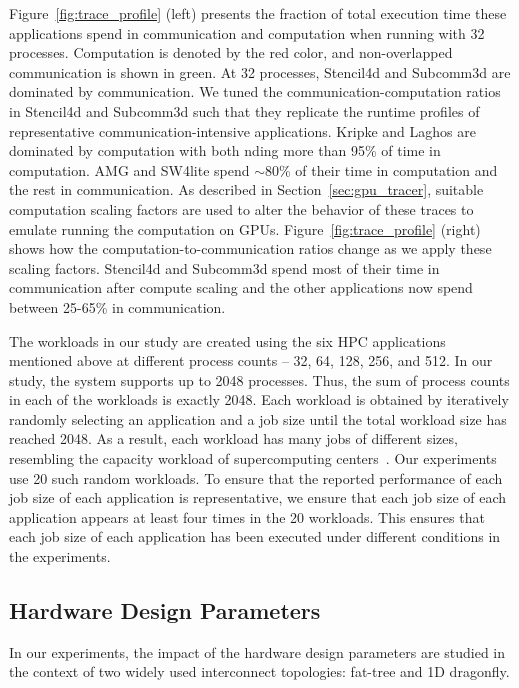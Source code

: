 Figure~\ref{fig:trace_profile} (left) presents the fraction of total execution
time these applications spend in communication and computation when running
with 32 processes.  Computation is denoted by the red color, and non-overlapped
communication is shown in green. At 32 processes, Stencil4d and Subcomm3d are
dominated by communication. We tuned the communication-computation ratios in
Stencil4d and Subcomm3d such that they replicate the runtime profiles of
representative communication-intensive applications.  Kripke and Laghos are
dominated by computation with both nding more than 95\% of time in computation.
AMG and SW4lite spend $\sim$80\% of their time in computation and the rest in
communication.  As described in Section~\ref{sec:gpu_tracer}, suitable
computation scaling factors are used to alter the behavior of these traces to
emulate running the computation on GPUs. Figure~\ref{fig:trace_profile} (right)
shows how the computation-to-communication ratios change as we apply these
scaling factors. Stencil4d and Subcomm3d spend most of their time in
communication after compute scaling and the other applications now spend
between 25-65\% in communication.

The workloads in our study are created using the six HPC applications mentioned
above at different process counts -- 32, 64, 128, 256, and 512.  In our study,
the system supports up to 2048 processes. Thus, the sum of process counts in
each of the workloads is exactly 2048.  Each workload is obtained by
iteratively randomly selecting an application and a job size until the total
workload size has reached 2048.  As a result, each workload has many jobs of
different sizes, resembling the capacity workload of supercomputing
centers~\cite{jain2016evaluating}.  Our experiments use 20 such random
workloads. To ensure that the reported performance of each job size of each
application is representative, we ensure that each job size of each application
appears at least four times in the 20 workloads. This ensures that each job
size of each application has been executed under different conditions in the
experiments.
 
\subsection{Hardware Design Parameters}
\label{sec:hardwareparameters}

\vspace{0.08in}
In our experiments, the impact of the hardware design parameters are studied in the context of two 
widely used interconnect topologies: fat-tree and 1D dragonfly.

